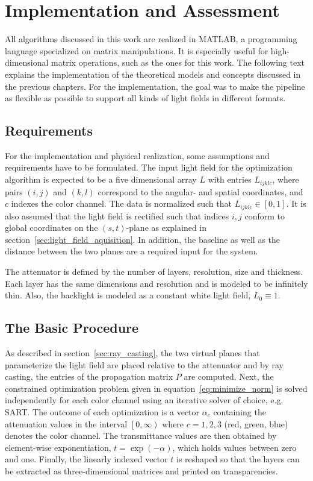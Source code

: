 \chapter{Implementation and Assessment}
\label{chp:Implementation_and_Assessment}

All algorithms discussed in this work are realized in \mbox{MATLAB}, a programming language specialized on matrix manipulations.
It is especially useful for high-dimensional matrix operations, such as the ones for this work.
The following text explains the implementation of the theoretical models and concepts discussed in the previous chapters.
For the implementation, the goal was to make the pipeline as flexible as possible to support all kinds of light fields in different formats.

\section{Requirements}
\label{sec:requirements}

For the implementation and physical realization, some assumptions and requirements have to be formulated.
The input light field for the optimization algorithm is expected to be a five dimensional array $L$ with entries $L_{ijklc}$, where pairs $(i, j)$ and $(k, l)$ correspond to the angular- and spatial coordinates, and $c$ indexes the color channel. 
The data is normalized such that $L_{ijklc} \in \left[0, 1\right]$.
It is also assumed that the light field is rectified such that indices $i, j$ conform to global coordinates on the $(s, t)$-plane as explained in section~\ref{sec:light_field_aquisition}.
In addition, the baseline as well as the distance between the two planes are a required input for the system.

The attenuator is defined by the number of layers, resolution, size and thickness.
Each layer has the same dimensions and resolution and is modeled to be infinitely thin.
Also, the backlight is modeled as a constant white light field, $L_0 \equiv 1$.

\section{The Basic Procedure}
\label{sec:basic_procedure}

As described in section~\ref{sec:ray_casting}, the two virtual planes that parameterize the light field are placed relative to the attenuator and by ray casting, the entries of the propagation matrix $P$ are computed.
Next, the constrained optimization problem given in equation~\ref{eq:minimize_norm} is solved independently for each color channel using an iterative solver of choice, e.g. \mbox{SART}.
The outcome of each optimization is a vector $\alpha_c$ containing the attenuation values in the interval $\left[ 0, \infty \right)$ where $c = 1, 2, 3$ (red, green, blue) denotes the color channel.
The transmittance values are then obtained by element-wise exponentiation, $t = \exp(-\alpha)$, which holds values between zero and one.
Finally, the linearly indexed vector $t$ is reshaped so that the layers can be extracted as three-dimensional matrices and printed on transparencies.

